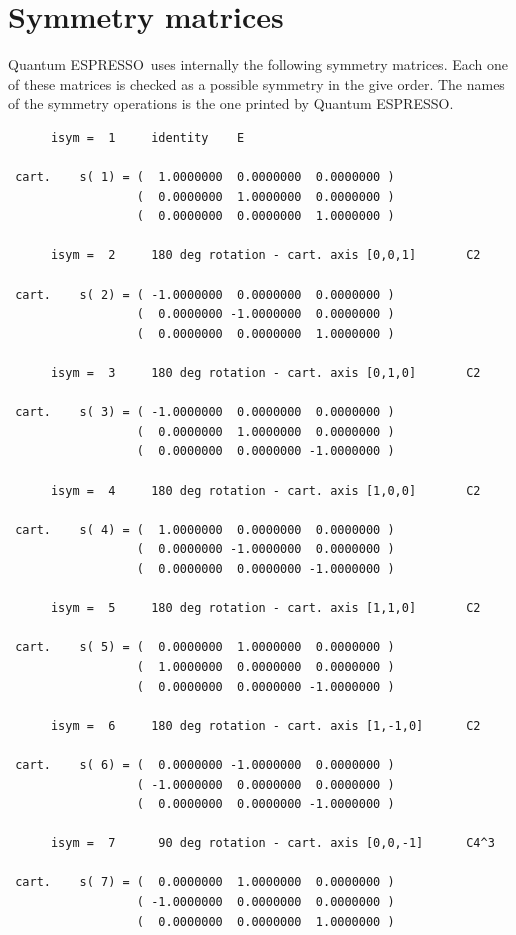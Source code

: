 \documentclass[12pt,a4paper]{article}
\def\qe{{\sc Quantum ESPRESSO}}
\begin{document}
\section{\color{coral}Symmetry matrices}
\qe\ uses internally the following symmetry matrices. Each one of these
matrices is checked as a possible symmetry in the give order. The names
of the symmetry operations is the one printed by \qe.
\begin{verbatim}
      isym =  1     identity    E

 cart.    s( 1) = (  1.0000000  0.0000000  0.0000000 )
                  (  0.0000000  1.0000000  0.0000000 )
                  (  0.0000000  0.0000000  1.0000000 )

      isym =  2     180 deg rotation - cart. axis [0,0,1]       C2

 cart.    s( 2) = ( -1.0000000  0.0000000  0.0000000 )
                  (  0.0000000 -1.0000000  0.0000000 )
                  (  0.0000000  0.0000000  1.0000000 )

      isym =  3     180 deg rotation - cart. axis [0,1,0]       C2

 cart.    s( 3) = ( -1.0000000  0.0000000  0.0000000 )
                  (  0.0000000  1.0000000  0.0000000 )
                  (  0.0000000  0.0000000 -1.0000000 )

      isym =  4     180 deg rotation - cart. axis [1,0,0]       C2

 cart.    s( 4) = (  1.0000000  0.0000000  0.0000000 )
                  (  0.0000000 -1.0000000  0.0000000 )
                  (  0.0000000  0.0000000 -1.0000000 )

      isym =  5     180 deg rotation - cart. axis [1,1,0]       C2

 cart.    s( 5) = (  0.0000000  1.0000000  0.0000000 )
                  (  1.0000000  0.0000000  0.0000000 )
                  (  0.0000000  0.0000000 -1.0000000 )

      isym =  6     180 deg rotation - cart. axis [1,-1,0]      C2

 cart.    s( 6) = (  0.0000000 -1.0000000  0.0000000 )
                  ( -1.0000000  0.0000000  0.0000000 )
                  (  0.0000000  0.0000000 -1.0000000 )

      isym =  7      90 deg rotation - cart. axis [0,0,-1]      C4^3

 cart.    s( 7) = (  0.0000000  1.0000000  0.0000000 )
                  ( -1.0000000  0.0000000  0.0000000 )
                  (  0.0000000  0.0000000  1.0000000 )


\end{verbatim}
\end{document}
